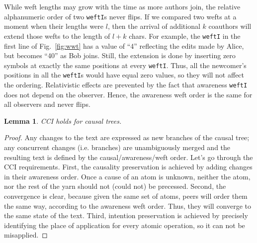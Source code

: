 \documentclass{sig-alternate}
\newtheorem{lemma}{Lemma}
\begin{document}
While weft lengths may grow with the time as more authors join, the relative alphanumeric order of two {\tt weftI}s never flips.
If we compared two wefts at a moment when their lengths were $l$, then the arrival of additional $k$ coauthors will extend those wefts to the length of $l+k$ chars.
For example, the {\tt weftI} in the first line of Fig.~\ref{fig:wwt} has a value of ``4'' reflecting the edits made by Alice, but becomes ``40'' as Bob joins.
Still, the extension is done by inserting zero symbols at exactly the same positions at every {\tt weftI}. %
Thus, all the newcomer's positions in all the {\tt weftI}s would have equal zero values, so they will not affect the ordering.
Relativistic effects are prevented by the fact that awareness {\tt weftI} does not depend on the observer.
Hence, the awareness weft order is the same for all observers and never flips.

\begin{lemma} 
CCI holds for causal trees. \label{lemma:cci}
\end{lemma}
\begin{proof} 
Any changes to the text are expressed as new branches  of the causal tree; any concurrent changes (i.e. branches) are unambiguously merged and the resulting text is defined by the causal/awareness/weft order.
Let's go through the CCI requirements.
First, the causality preservation is achieved by adding changes in their awareness order. Once a cause of an atom is unknown, neither the atom, nor the rest of the yarn should not (could not) be precessed.
Second, the convergence is clear, because given the same set of atoms, peers will order them the same way, according to the awareness weft order. Thus, they will converge to the same state of the text.
Third, intention preservation is achieved by precisely identifying the place of application for every atomic operation, so it can not be misapplied.
\end{proof}
\end{document}
